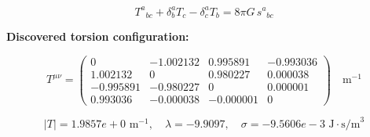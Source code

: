 
\begin{equation}
  T^a{}_{bc} + \delta^a_b T_c - \delta^a_c T_b = 8\pi G \, s^a{}_{bc}
\end{equation}

\textbf{Discovered torsion configuration:}

\begin{equation}
  T^{\mu\nu} = \begin{pmatrix}
    0 & -1.002132 & 0.995891 & -0.993036 \\
    1.002132 & 0 & 0.980227 & 0.000038 \\
    -0.995891 & -0.980227 & 0 & 0.000001 \\
    0.993036 & -0.000038 & -0.000001 & 0
  \end{pmatrix} \quad \text{m}^{-1}
\end{equation}

\begin{equation}
  |T| = 1.9857e+0 \text{ m}^{-1}, \quad
  \lambda = -9.9097, \quad
  \sigma = -9.5606e-3 \text{ J}\cdot\text{s/m}^3
\end{equation}